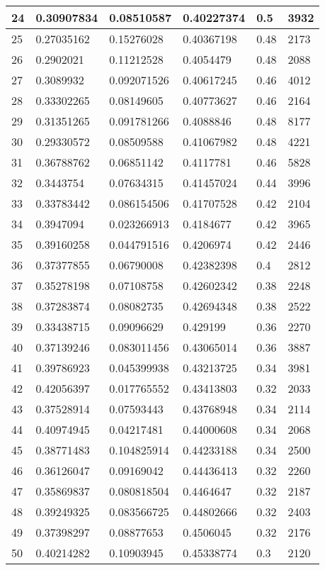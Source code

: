 \begin{longtable}{|l|l|l|l|l|l|}
24 & 0.30907834 & 0.08510587 & 0.40227374 & 0.5 & 3932 \\ \hline 
25 & 0.27035162 & 0.15276028 & 0.40367198 & 0.48 & 2173 \\ \hline 
26 & 0.2902021 & 0.11212528 & 0.4054479 & 0.48 & 2088 \\ \hline 
27 & 0.3089932 & 0.092071526 & 0.40617245 & 0.46 & 4012 \\ \hline 
28 & 0.33302265 & 0.08149605 & 0.40773627 & 0.46 & 2164 \\ \hline 
29 & 0.31351265 & 0.091781266 & 0.4088846 & 0.48 & 8177 \\ \hline 
30 & 0.29330572 & 0.08509588 & 0.41067982 & 0.48 & 4221 \\ \hline 
31 & 0.36788762 & 0.06851142 & 0.4117781 & 0.46 & 5828 \\ \hline 
32 & 0.3443754 & 0.07634315 & 0.41457024 & 0.44 & 3996 \\ \hline 
33 & 0.33783442 & 0.086154506 & 0.41707528 & 0.42 & 2104 \\ \hline 
34 & 0.3947094 & 0.023266913 & 0.4184677 & 0.42 & 3965 \\ \hline 
35 & 0.39160258 & 0.044791516 & 0.4206974 & 0.42 & 2446 \\ \hline 
36 & 0.37377855 & 0.06790008 & 0.42382398 & 0.4 & 2812 \\ \hline 
37 & 0.35278198 & 0.07108758 & 0.42602342 & 0.38 & 2248 \\ \hline 
38 & 0.37283874 & 0.08082735 & 0.42694348 & 0.38 & 2522 \\ \hline 
39 & 0.33438715 & 0.09096629 & 0.429199 & 0.36 & 2270 \\ \hline 
40 & 0.37139246 & 0.083011456 & 0.43065014 & 0.36 & 3887 \\ \hline 
41 & 0.39786923 & 0.045399938 & 0.43213725 & 0.34 & 3981 \\ \hline 
42 & 0.42056397 & 0.017765552 & 0.43413803 & 0.32 & 2033 \\ \hline 
43 & 0.37528914 & 0.07593443 & 0.43768948 & 0.34 & 2114 \\ \hline 
44 & 0.40974945 & 0.04217481 & 0.44000608 & 0.34 & 2068 \\ \hline 
45 & 0.38771483 & 0.104825914 & 0.44233188 & 0.34 & 2500 \\ \hline 
46 & 0.36126047 & 0.09169042 & 0.44436413 & 0.32 & 2260 \\ \hline 
47 & 0.35869837 & 0.080818504 & 0.4464647 & 0.32 & 2187 \\ \hline 
48 & 0.39249325 & 0.083566725 & 0.44802666 & 0.32 & 2403 \\ \hline 
49 & 0.37398297 & 0.08877653 & 0.4506045 & 0.32 & 2176 \\ \hline 
50 & 0.40214282 & 0.10903945 & 0.45338774 & 0.3 & 2120 \\ \hline 
\end{longtable}